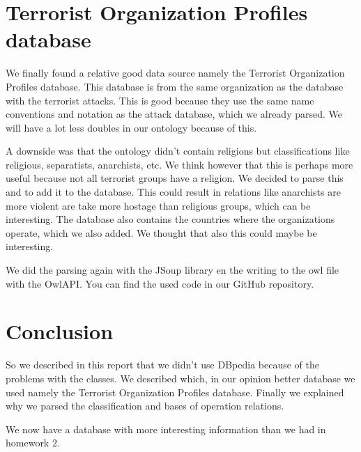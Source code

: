 \documentclass{article}
\begin{document}
\section{Terrorist Organization Profiles database}
\label{sec:startdb}
We finally found a relative good data source namely the Terrorist Organization Profiles database\cite{start}. This database is from the same organization as the database with the terrorist attacks. This is good because they use the same name conventions and notation as the attack database, which we already parsed. We will have a lot less doubles in our ontology because of this.\par
A downside was that the ontology didn't contain religions but classifications like religious, separatists, anarchists, etc. We think however that this is perhaps more useful because not all terrorist groups have a religion. We decided to parse this and to add it to the database. This could result in relations like anarchists are more violent are take more hostage than religious groups, which can be interesting. The database also contains the countries where the organizations operate, which we also added. We thought that also this could maybe be interesting.\par
We did the parsing again with the JSoup\cite{jsoup} library en the writing to the owl file with the OwlAPI\cite{owlapi}. You can find the used code in our GitHub repository\cite{githubproject}.
\section{Conclusion}
So we described in this report that we didn't use DBpedia because of the problems with the classes. We described which, in our opinion better database we used namely the Terrorist Organization Profiles database. Finally we explained why we parsed the classification and bases of operation relations.\par
We now have a database with more interesting information than we had in homework 2.
\label{sec:conclusion}
\printbibliography
\end{document}
